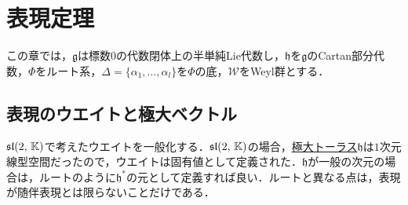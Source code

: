 \documentclass[rep_main]{subfiles}
\begin{document}
\setcounter{chapter}{5}

\chapter{表現定理}
この章では，$\mathfrak{g}$は標数$0$の代数閉体上の半単純Lie代数し，$\mathfrak{h}$を$\mathfrak{g}$のCartan部分代数，$\Phi$をルート系，$\Delta = \{\alpha_1, \ldots, \alpha_l\}$を$\Phi$の底，$\mathscr{W}$をWeyl群とする．

\section{表現のウエイトと極大ベクトル}
$\mathfrak{sl}(2,\, \mathbb{K})$で考えたウエイトを一般化する．$\mathfrak{sl}(2,\, \mathbb{K})$の場合，\hyperref[def:toral-subLieAlg]{極大トーラス}$\mathfrak{h}$は$1$次元線型空間だったので，ウエイトは固有値として定義された．$\mathfrak{h}$が一般の次元の場合は，ルートのように$\mathfrak{h}^*$の元として定義すれば良い．ルートと異なる点は，表現が随伴表現とは限らないことだけである．
\end{document}
